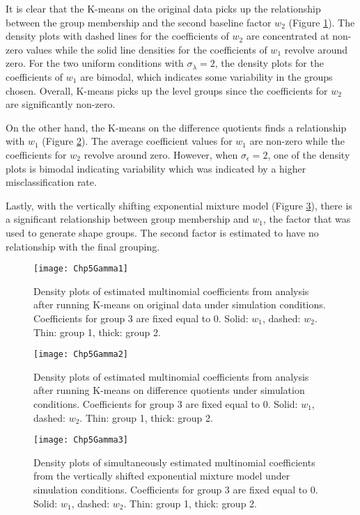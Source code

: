 It is clear that the K-means on the original data picks up the relationship between the group membership and the second baseline factor $w_{2}$ (Figure \ref{fig:gamma1}). The density plots with dashed lines for the coefficients of $w_{2}$ are concentrated at non-zero values while the solid line densities for the coefficients of $w_{1}$ revolve around zero. For the two uniform conditions with $\sigma_{\lambda}=2$, the density plots for the coefficients of $w_{1}$ are bimodal, which indicates some variability in the groups chosen. Overall, K-means picks up the level groups since the coefficients for $w_{2}$ are significantly non-zero.

On the other hand, the K-means on the difference quotients finds a relationship with $w_{1}$ (Figure \ref{fig:gamma2}). The average coefficient values for $w_{1}$ are non-zero while the coefficients for $w_{2}$ revolve around zero. However, when $\sigma_{\epsilon}=2$, one of the density plots is bimodal indicating variability which was indicated by a higher misclassification rate.

Lastly, with the vertically shifting exponential mixture model (Figure \ref{fig:gamma3}), there is a significant relationship between group membership and $w_{1}$, the factor that was used to generate shape groups. The second factor is estimated to have no relationship with the final grouping.

\begin{landscape}
\begin{figure}[ht]
\centering
\texttt{[image: Chp5Gamma1]}
\caption{Density plots of estimated multinomial coefficients from analysis after running K-means on original data under  simulation conditions. Coefficients for group 3 are fixed equal to 0. Solid: $w_{1}$, dashed: $w_{2}$. Thin: group 1, thick:  group 2.}
\label{fig:gamma1}
\end{figure}

\begin{figure}[ht]
\centering
\texttt{[image: Chp5Gamma2]}
\caption{Density plots of estimated multinomial coefficients from analysis after running K-means on difference quotients under simulation conditions. Coefficients for group 3 are fixed equal to 0. Solid: $w_{1}$, dashed: $w_{2}$. Thin: group 1, thick:  group 2.}
\label{fig:gamma2}
\end{figure}
\begin{figure}[ht]
\centering
\texttt{[image: Chp5Gamma3]}
\caption{Density plots of simultaneously estimated multinomial coefficients from the vertically shifted exponential mixture model under simulation conditions. Coefficients for group 3 are fixed equal to 0. Solid: $w_{1}$, dashed: $w_{2}$. Thin: group 1, thick:  group 2.}
\label{fig:gamma3}
\end{figure}
\end{landscape}

